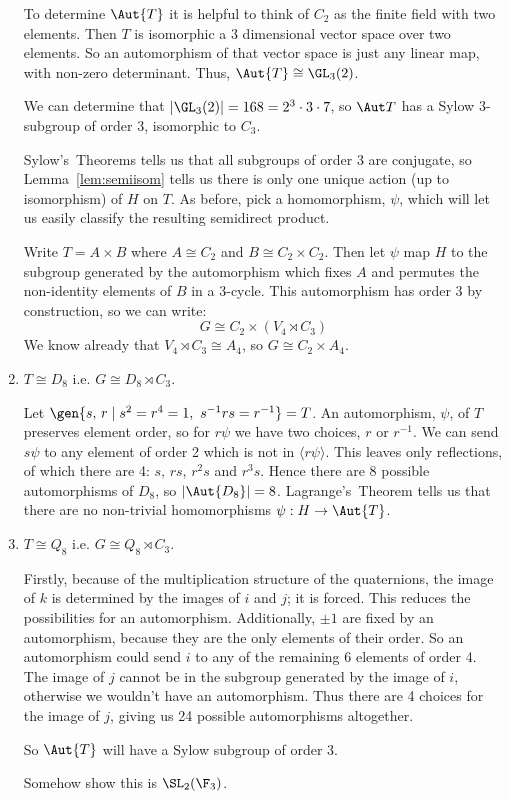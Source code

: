 \begin{enumerate}
        To determine \(\Aut{T}\) it is helpful to think of \(C_2\) as the finite field with two elements.
        Then \(T\) is isomorphic a 3 dimensional vector space over two elements.
        So an automorphism of that vector space is just any linear map, with non-zero determinant.
        Thus, \(\Aut{T} \cong \GL_3(2)\).

        We can determine that \(|\GL_3(2)| = 168 = 2^3 \cdot 3 \cdot 7\), so \(\Aut T\) has a Sylow 3-subgroup of order
        3, isomorphic to \(C_3\).

        Sylow's~Theorems tells us that all subgroups of order 3 are conjugate, so Lemma~\ref{lem:semiisom} tells us
        there is only one unique action (up to isomorphism) of \(H\) on \(T\).
        As before, pick a homomorphism, \(\psi\), which will let us easily classify the resulting semidirect product.

        Write \(T = A \times B\) where \(A \cong C_2\) and \(B \cong C_2 \times C_2\).
        Then let \(\psi\) map \(H\) to the subgroup generated by the automorphism which fixes \(A\) and permutes the
        non-identity elements of \(B\) in a 3-cycle.
        This automorphism has order 3 by construction, so we can write:
        \[G \cong C_2 \times (V_4 \rtimes C_3)\]
        We know already that \(V_4 \rtimes C_3 \cong A_4\), so \(G \cong C_2 \times A_4\).

    \item \(T \cong D_8\) i.e. \(G \cong D_8 \rtimes C_3\).

        Let \(\gen{s,\,r \mid s^2 = r^4 = 1,\ s^{-1}rs = r^{-1}} = T\).
        An automorphism, \(\psi\), of \(T\) preserves element order, so for \(r\psi\) we have two choices, \(r\) or
        \(r^{-1}\).
        We can send \(s\psi\) to any element of order 2 which is not in \(\langle r\psi \rangle\).
        This leaves only reflections, of which there are 4: \(s,\,rs,\,r^2s\) and \(r^3s\).
        Hence there are 8 possible automorphisms of \(D_8\), so \(|\Aut{D_8}| = 8\).
        Lagrange's~Theorem tells us that there are no non-trivial homomorphisms \(\psi:H \to \Aut{T}\).

    \item \(T \cong Q_8\) i.e. \(G \cong Q_8 \rtimes C_3\).

        Firstly, because of the multiplication structure of the quaternions, the image of \(k\) is determined by the
        images of \(i\) and \(j\); it is forced.
        This reduces the possibilities for an automorphism.
        Additionally, \(\pm 1\) are fixed by an automorphism, because they are the only elements of their order.
        So an automorphism could send \(i\) to any of the remaining 6 elements of order 4.
        The image of \(j\) cannot be in the subgroup generated by the image of \(i\), otherwise we wouldn't have an
        automorphism.
        Thus there are 4 choices for the image of \(j\), giving us 24 possible automorphisms altogether.

        So \(\Aut{T}\) will have a Sylow subgroup of order 3.


        Somehow show this is \(\SL_2(\F_3)\).
\end{enumerate}


